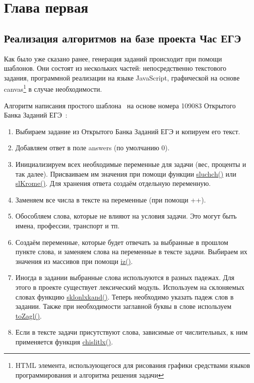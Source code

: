 
\section{Глава первая}
\subsection{Реализация алгоритмов на базе проекта Час ЕГЭ}
Как было уже сказано ранее, генерация заданий происходит при помощи шаблонов.
Они состоят из нескольких частей: непосредственно текстового задания, программной реализации на языке JavaScript,
графической на основе canvas\footnote{HTML элемента, использующегося для рисования графики средствами языков программирования и алгоритма решения задачи} в случае необходимости.

Алгоритм написания простого шаблона~\cite{chasi} на основе номера 109083 Открытого Банка Заданий ЕГЭ~\cite{fipi}:
\begin{enumerate}
    \item Выбираем задание из Открытого Банка Заданий ЕГЭ и копируем его текст.
    \item Добавляем ответ в поле answers (по умолчанию 0).
          
    \item Инициализируем всех необходимые переменные для задачи (вес, проценты и так далее).
          Присваиваем им значения при помощи функции \hyperlink{sluchch}{sluchch()} или
          \hyperlink{slKrome}{slKrome()}. Для хранения ответа создаём отдельную переменную.
          
    \item Заменяем все числа в тексте на переменные (при помощи ++).
    \item Обособляем слова, которые не влияют на условия задачи. Это могут быть имена, профессии, транспорт и тп.
    \item Создаём переменные, которые будет отвечать за выбранные в прошлом пункте слова, и заменяем слова на переменные в тексте задачи.
          Выбираем их значения из массивов при помощи \hyperlink{iz}{iz()}.
    \item Иногда в задании выбранные слова используются в разных падежах. Для этого в проекте существует лексический модуль. Используем на склоняемых словах функцию \hyperlink{sklonlxkand}{sklonlxkand()}. Теперь необходимо указать падеж слов в задании.
          Также при необходимости заглавной буквы в слове используем \hyperlink{toZagl}{toZagl()}.
    \item Если в тексте задачи присутствуют слова, зависимые от числительных, к ним применяется функция \hyperlink{chislitlx}{chislitlx()}.
          
\end{enumerate}

